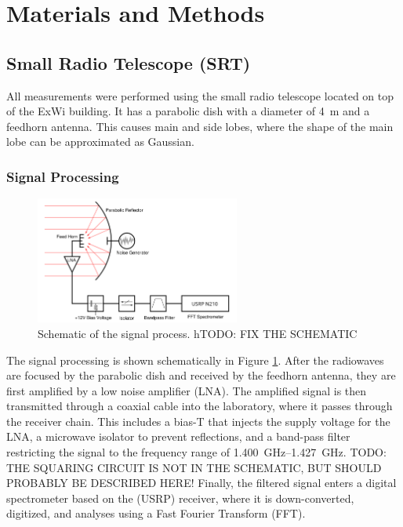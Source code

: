 
\section{Materials and Methods}

\subsection{Small Radio Telescope (SRT)}
All measurements were performed using the small radio telescope located on top of the ExWi building.
It has a parabolic dish with a diameter of \SI{4}{m} and a feedhorn antenna. This causes main and side lobes, where the shape of the main lobe can be approximated as Gaussian.

\subsubsection{Signal Processing}
\begin{figure}[H]
    \centering
    \includegraphics[width=0.6\textwidth]{assets/schematic.png}
    \caption{Schematic of the signal process. \cite[Fig. 3]{srt} hTODO: FIX THE SCHEMATIC}
    \label{fig:signal}
\end{figure}
The signal processing is shown schematically in Figure \ref{fig:signal}.
After the radiowaves are focused by the parabolic dish and received by the feedhorn antenna, they are first amplified by a low noise amplifier (LNA).
The amplified signal is then transmitted through a coaxial cable into the laboratory, where it passes through the receiver chain. This includes a bias-T that injects the supply voltage for the LNA,
a microwave isolator to prevent reflections, and a band-pass filter restricting the signal to the frequency range of \qtyrange{1.400}{1.427}{GHz}.
TODO: THE SQUARING CIRCUIT IS NOT IN THE SCHEMATIC, BUT SHOULD PROBABLY BE DESCRIBED HERE!
Finally, the filtered signal enters a digital spectrometer based on the  (USRP) receiver,
where it is down-converted, digitized, and analyses using a Fast Fourier Transform (FFT). \cite[Sec. 4]{srt}

